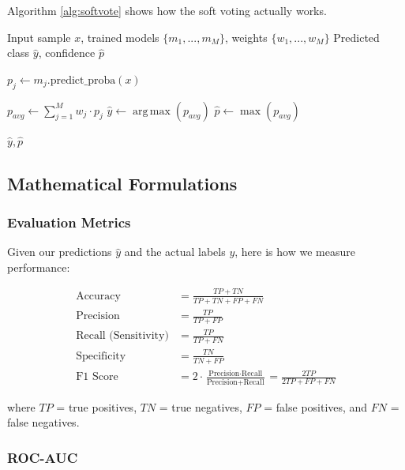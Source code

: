 \documentclass[12pt]{article}
\DeclareMathOperator*{\argmax}{arg\,max}
\begin{document}
Algorithm \ref{alg:softvote} shows how the soft voting actually works.

\begin{algorithm}[H]
\caption{Soft Voting Prediction}
\label{alg:softvote}
\begin{algorithmic}[1]
\Require Input sample $x$, trained models $\{m_1, ..., m_M\}$, weights $\{w_1, ..., w_M\}$
\Ensure Predicted class $\hat{y}$, confidence $\hat{p}$

    \State $p_j \gets m_j.\text{predict\_proba}(x)$ 
\EndFor

\State $p_{avg} \gets \sum_{j=1}^{M} w_j \cdot p_j$ 
\State $\hat{y} \gets \argmax(p_{avg})$
\State $\hat{p} \gets \max(p_{avg})$ 

\State \Return $\hat{y}, \hat{p}$
\end{algorithmic}
\end{algorithm}

\subsection{Mathematical Formulations}

\subsubsection{Evaluation Metrics}

Given our predictions $\hat{y}$ and the actual labels $y$, here is how we measure performance:

\begin{align}
\text{Accuracy} &= \frac{TP + TN}{TP + TN + FP + FN} \\[0.5em]
\text{Precision} &= \frac{TP}{TP + FP} \\[0.5em]
\text{Recall (Sensitivity)} &= \frac{TP}{TP + FN} \\[0.5em]
\text{Specificity} &= \frac{TN}{TN + FP} \\[0.5em]
\text{F1 Score} &= 2 \cdot \frac{\text{Precision} \cdot \text{Recall}}{\text{Precision} + \text{Recall}} = \frac{2TP}{2TP + FP + FN}
\end{align}

where $TP$ = true positives, $TN$ = true negatives, $FP$ = false positives, and $FN$ = false negatives.

\subsubsection{ROC-AUC}
\end{document}

